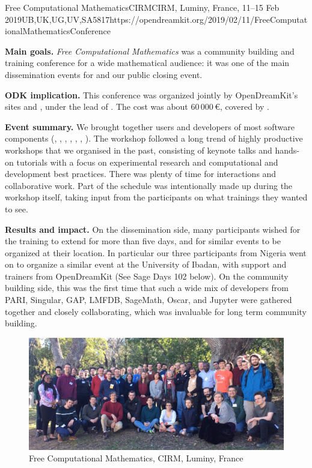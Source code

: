 \begin{event}{Free Computational Mathematics}{CIRM}{CIRM, Luminy, France, 11--15 Feb 2019}{UB,UK,UG,UV,SA}{58}{17}{https://opendreamkit.org/2019/02/11/FreeComputationalMathematicsConference}

\textbf{Main goals.} \emph{Free Computational Mathematics} was
a community building and training conference for a wide mathematical audience:
it was one of the main dissemination events for \ODK and our public closing event.

\textbf{ODK implication.} This conference was organized jointly by
OpenDreamKit's sites  and , under the lead of .
The cost was about 60\,000\,\euro, covered by .

\textbf{Event summary.}
We brought together users and developers of most \ODK software components
(\GAP, \Jupyter, \Linbox, \MPIR, \PariGP, \Sage, \Singular).
The workshop followed a long trend of highly productive workshops that we organised in the past,
consisting of keynote talks and hands-on tutorials with a focus on experimental research
and computational and development best practices.
There was plenty of time for interactions and collaborative work.
Part of the schedule was intentionally made up during the workshop itself,
taking input from the participants on what trainings they wanted to see.


\textbf{Results and impact.} On the dissemination side, many
participants wished for the training to extend for more than five
days, and for similar events to be organized at their location. In
particular our three participants from Nigeria went on to organize a
similar event at the University of Ibadan, with support and trainers
from OpenDreamKit (See Sage Days 102 below). On the community building
side, this was the first time that such a wide mix of developers from
PARI, Singular, GAP, LMFDB, SageMath, Oscar, and Jupyter were gathered
together and closely collaborating, which was invaluable for long term
community building.

\begin{figure}[ht]
  \includegraphics[width=.75\textwidth]{CIRM.jpg}
  \caption*{Free Computational Mathematics, CIRM, Luminy, France}
\end{figure}

\end{event}

